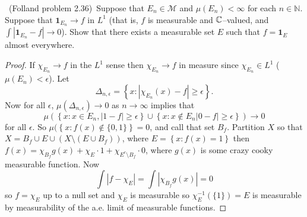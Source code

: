 \documentclass[11pt]{amsart}
\theoremstyle{definition}
\numberwithin{theorem}{section}
\numberwithin{definition}{section}
\numberwithin{equation}{section}
\def\naturals{{\mathbb N}}
\def\complex{{\mathbb C}\/}
\newcommand{\set}[1]{ \left\{ #1 \right\} }
\def\one{{\mathbf 1}}
\def\scriptm{{\mathcal M}}
\begin{document}
\medskip {}\ (Folland problem 2.36)\ 
Suppose that $E_n\in\scriptm$ and $\mu(E_n)<\infty$ for each $n\in\naturals$.
Suppose that $\one_{E_n}\to f$ in $L^1$ (that is, $f$ is measurable and $\complex$--valued, 
and $\int |\one_{E_n}-f|\to 0$).
Show that there exists a measurable set $E$ such that $f=\one_E$ almost everywhere.
\begin{proof}
If $\chi_{E_n} \to f$ in the $L^1$ sense then $\chi_{E_n} \to f$ in measure since $\chi_{E_n} \in L^1$ ($\mu(E_n) < \epsilon$).  Let $$\Delta_{n, \epsilon} = \set{x\mathrel{}:\mathrel{}\left|\chi_{E_n}(x) -f \right|\geq \epsilon}.$$
Now for all $\epsilon$, $\mu(\Delta_{n,\epsilon}) \to 0$ as $n \to \infty$ implies that 
\begin{equation*}
	\mu(\set{x\mathrel{}:\mathrel{}x \in E_n, \left|1 -f \right|\geq \epsilon} \cup \set{x\mathrel{}:\mathrel{}x \notin E_n\left|0-f \right|\geq \epsilon}) \to 0
\end{equation*}
for all $\epsilon.$ So $\mu(\set{x\mathrel{}:\mathrel{}f(x) \notin \{0,1\}} = 0$, and call that set $B_f$. Partition $X$ so that $X = B_f \cup E \cup (X \setminus (E \cup B_f))$, where $E = \set{x\mathrel{}:\mathrel{}f(x) = 1}$ then $f(x) = \chi_{B_f}g(x) + \chi_E\cdot1 + \chi_{E^c \setminus B_f} \cdot 0$, where $g(x)$ is some crazy cooky measurable function. Now
\begin{equation*}
	\int |f - \chi_E| = \int |\chi_{B_f}g(x)| = 0
\end{equation*}
so $f = \chi_E$ up to a null set and $\chi_E$ is measurable so $\chi_E^{-1}(\{1\}) = E$ is measurable by measurability of the a.e. limit of measurable functions.
\end{proof}
\end{document}
